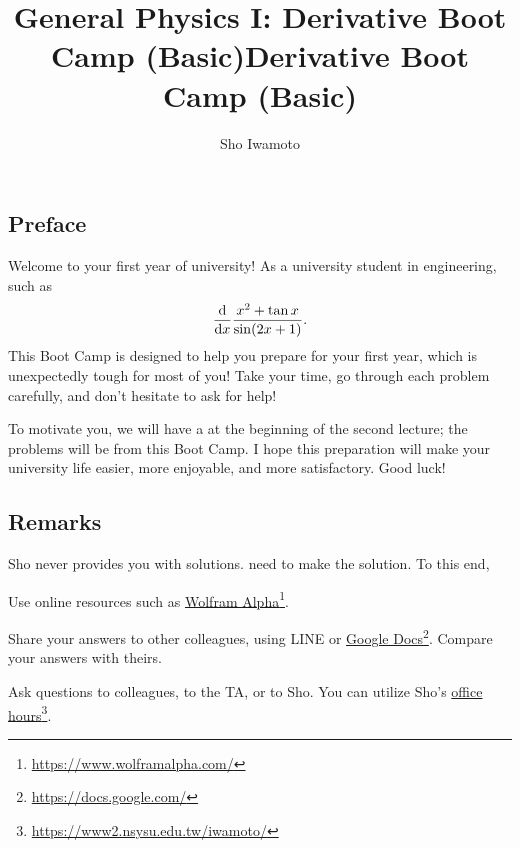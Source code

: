 \documentclass[11pt,pdfa,lastpage]{MishoNote}
\title{General Physics I: Derivative Boot Camp (Basic)}
\author{Sho Iwamoto}
\newcommand\hrefFN[2]{\href{#1}{#2}\footnote{\url{#1}}}
\let\origfootnote\footnote
\let\origfootnoterule\footnoterule
\begin{document}
%
\title{Derivative Boot Camp (Basic)}\begin{maketitle}
\let\footnote\origfootnote
\let\footnoterule\origfootnoterule

\subsection*{Preface}
Welcome to your first year of university!
As a university student in engineering,  such as
\[
\diff{}{x}\frac{x^2+\tan x}{\sin(2x+1)}.
\]
This Boot Camp is designed to help you prepare for your first year, which is unexpectedly tough for most of you!
Take your time, go through each problem carefully, and don't hesitate to ask for help!

To motivate you, we will have a  at the beginning of the second lecture; the problems will be from this Boot Camp.
I hope this preparation will make your university life easier, more enjoyable, and more satisfactory. Good luck!

\subsection*{Remarks}
Sho never provides you with solutions.  need to make the solution. To this end,
\begin{miniitemize}
  \item Use online resources such as \hrefFN{https://www.wolframalpha.com/}{Wolfram Alpha}.
  \item Share your answers to other colleagues, using LINE or \hrefFN{https://docs.google.com/}{Google Docs}. Compare your answers with theirs.
  \item Ask questions to colleagues, to the TA, or to Sho. You can utilize Sho's \hrefFN{https://www2.nsysu.edu.tw/iwamoto/}{office hours}.
\end{miniitemize}


\enlargethispage{-5em}


\end{maketitle}
\end{document}
